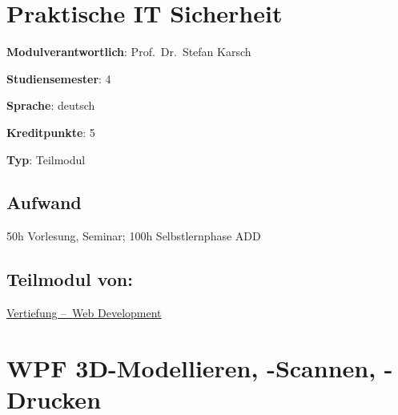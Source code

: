 \hypertarget{praktische-it-sicherheitpathlabelmi-2017modulbeschreibungen-bachelorba_wd_praktische-it-sicherheit}{%
\chapter{Praktische IT
Sicherheit\label{/mi-2017/modulbeschreibungen-bachelor/BA_WD_Praktische-IT-Sicherheit}}\label{praktische-it-sicherheitpathlabelmi-2017modulbeschreibungen-bachelorba_wd_praktische-it-sicherheit}}

\begin{modulHead}
\textbf{Modulverantwortlich}: Prof.~Dr.~Stefan
Karsch
\end{modulHead}
\begin{modulHead}
\textbf{Studiensemester}:
4
\end{modulHead}
\begin{modulHead}
\textbf{Sprache}:
deutsch
\end{modulHead}
\begin{modulHead}
\textbf{Kreditpunkte}:
5
\end{modulHead}
\begin{modulHead}
\textbf{Typ}:
Teilmodul
\end{modulHead}


\hypertarget{aufwandpathlabelmi-2017modulbeschreibungen-bachelorba_wd_praktische-it-sicherheit}{%
\section*{Aufwand\label{/mi-2017/modulbeschreibungen-bachelor/BA_WD_Praktische-IT-Sicherheit}}\label{aufwandpathlabelmi-2017modulbeschreibungen-bachelorba_wd_praktische-it-sicherheit}}

50h Vorlesung, Seminar; 100h Selbstlernphase ADD

\hypertarget{teilmodul-vonpathlabelmi-2017modulbeschreibungen-bachelorba_wd_praktische-it-sicherheit}{%
\section*{Teilmodul
von:\label{/mi-2017/modulbeschreibungen-bachelor/BA_WD_Praktische-IT-Sicherheit}}\label{teilmodul-vonpathlabelmi-2017modulbeschreibungen-bachelorba_wd_praktische-it-sicherheit}}

\hyperref[/mi-2017/modulbeschreibungen-bachelor/BA_Vertiefung-Web_Development]{Vertiefung – Web Development}

\hypertarget{wpf-3d-modellieren--scannen--druckenpathlabelmi-2017modulbeschreibungen-bachelorba_wpf-3d-msd}{%
\chapter{WPF 3D-Modellieren, -Scannen,
-Drucken\label{/mi-2017/modulbeschreibungen-bachelor/BA_WPF-3D-MSD}}\label{wpf-3d-modellieren--scannen--druckenpathlabelmi-2017modulbeschreibungen-bachelorba_wpf-3d-msd}}

